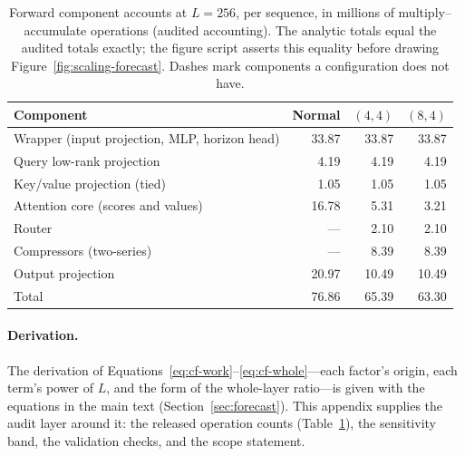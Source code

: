 \begin{table}[t]
\centering
\small
\caption{Forward component accounts at $L{=}256$, per sequence, in
millions of multiply--accumulate operations (audited accounting). The
analytic totals equal the audited totals exactly; the figure script
asserts this equality before drawing Figure~\ref{fig:scaling-forecast}.
Dashes mark components a configuration does not have.}
\label{tab:energy-components}
\begin{tabular}{lrrr}
\toprule
Component & Normal & $(4,4)$ & $(8,4)$ \\
\midrule
Wrapper (input projection, MLP, horizon head) & 33.87 & 33.87 & 33.87 \\
Query low-rank projection & 4.19 & 4.19 & 4.19 \\
Key/value projection (tied) & 1.05 & 1.05 & 1.05 \\
Attention core (scores and values) & 16.78 & 5.31 & 3.21 \\
Router & --- & 2.10 & 2.10 \\
Compressors (two-series) & --- & 8.39 & 8.39 \\
Output projection & 20.97 & 10.49 & 10.49 \\
\midrule
Total & 76.86 & 65.39 & 63.30 \\
\bottomrule
\end{tabular}
\end{table}

\paragraph{Derivation.} The derivation of Equations~\ref{eq:cf-work}--\ref{eq:cf-whole}---each factor's origin, each term's power of $L$, and the form of the whole-layer ratio---is given with the equations in the main text (Section~\ref{sec:forecast}). This appendix supplies the audit layer around it: the released operation counts (Table~\ref{tab:energy-components}), the sensitivity band, the validation checks, and the scope statement.

